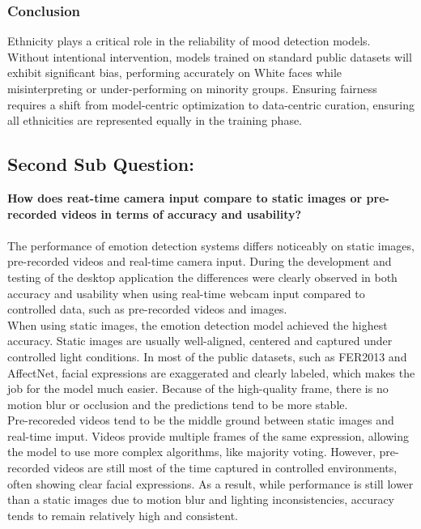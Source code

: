 \documentclass[12pt,a4paper]{article}
\begin{document}
\subsubsection*{Conclusion}
Ethnicity plays a critical role in the reliability of mood detection models. Without intentional intervention, models trained on standard public datasets will exhibit significant bias, performing accurately on White faces while misinterpreting or under-performing on minority groups. Ensuring fairness requires a shift from model-centric optimization to data-centric curation, ensuring all ethnicities are represented equally in the training phase.

\subsection{Second Sub Question:}
\textbf{How does reat-time camera input compare to static images or pre-recorded videos in terms of accuracy and usability?}\\\\
The performance of emotion detection systems differs noticeably on static images, pre-recorded videos and real-time camera input. During the development and testing of the desktop application the differences were clearly observed in both accuracy and usability when using real-time webcam input compared to controlled data, such as pre-recorded videos and images.\\
When using static images, the emotion detection model achieved the highest accuracy. Static images are usually well-aligned, centered and captured under controlled light conditions. In most of the public datasets, such as FER2013 and AffectNet, facial expressions are exaggerated and clearly labeled, which makes the job for the model much easier. Because of the high-quality frame, there is no motion blur or occlusion and the predictions tend to be more stable.\\
Pre-recoreded videos tend to be the middle ground between static images and real-time imput. Videos provide multiple frames of the same expression, allowing the model to use more complex algorithms, like majority voting. However, pre-recorded videos are still most of the time captured in controlled environments, often showing clear facial expressions. As a result, while performance is still lower than a static images due to motion blur and lighting inconsistencies, accuracy tends to remain relatively high and consistent.\\
\end{document}
